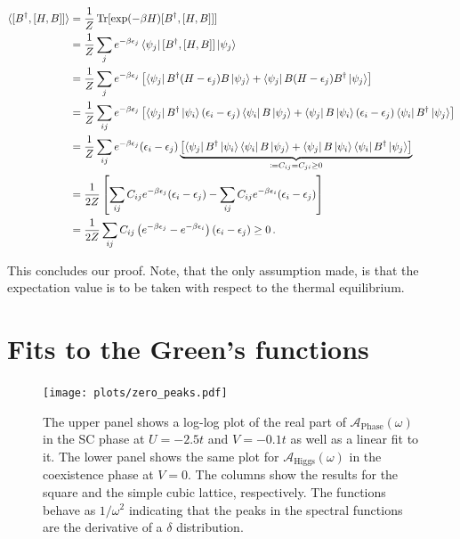 \documentclass[
    reprint, 
    aps,
    preprintnumbers,
    twocolumn,
    prb,
    superscriptaddress
]{revtex4-2}
\newcommand{\spectral}[1]{\mathcal{A}_\text{#1}  (\omega)}
\begin{document}
\begin{widetext}
    \begin{align}
        \langle [B^\dagger, [H, B]] \rangle &= \frac{1}{Z} \Trace [\exp(-\beta H) [B^\dagger, [H, B]]] \nonumber \\
            &= \frac{1}{Z} \sum_j e^{-\beta \epsilon_j} \bra{\psi_j} [B^\dagger, [H, B]] \ket{\psi_j} \nonumber \\
            &= \frac{1}{Z} \sum_j e^{-\beta \epsilon_j} \left[ \bra{\psi_j} B^\dagger (H - \epsilon_j) B \ket{\psi_j} + \bra{\psi_j} B (H - \epsilon_j) B^\dagger \ket{\psi_j} \right] \nonumber \\
            &= \frac{1}{Z} \sum_{ij} e^{-\beta \epsilon_j} \left[ \bra{\psi_j} B^\dagger \ket{\psi_i} (\epsilon_i - \epsilon_j) \bra{\psi_i} B \ket{\psi_j} + \bra{\psi_j} B \ket{\psi_i} (\epsilon_i - \epsilon_j) \bra{\psi_i} B^\dagger \ket{\psi_j} \right] \nonumber \\
            &= \frac{1}{Z} \sum_{ij} e^{-\beta \epsilon_j} (\epsilon_i - \epsilon_j) \underbrace{ \left[ \bra{\psi_j} B^\dagger \ket{\psi_i} \bra{\psi_i} B \ket{\psi_j} + \bra{\psi_j} B \ket{\psi_i} \bra{\psi_i} B^\dagger \ket{\psi_j} \right]}_{\coloneqq C_{ij} = C_{ji} \geq 0} \nonumber \\
            &= \frac{1}{2Z} \left[ \sum_{ij} C_{ij} e^{-\beta \epsilon_j} (\epsilon_i - \epsilon_j) - \sum_{ij} C_{ij} e^{-\beta \epsilon_i} (\epsilon_i - \epsilon_j) \right] \nonumber \\
            &= \frac{1}{2Z} \sum_{ij} C_{ij} \left( e^{-\beta \epsilon_j} - e^{-\beta \epsilon_i} \right) \left( \epsilon_i - \epsilon_j \right) \geq 0 \,.
    \end{align}
\end{widetext}

This concludes our proof. Note, that the only assumption made, is that the expectation value is to be taken with respect to the thermal equilibrium.


\section{Fits to the Green's functions}
\label{sec:fit_greens_functions}

\begin{figure}
    \centering
    \texttt{[image: plots/zero\_peaks.pdf]}
    \caption{The upper panel shows a log-log plot of the real part of $\spectral{Phase}$ in the SC phase at $U=-2.5t$ and $V=-0.1t$ as well as a linear fit to it.
    The lower panel shows the same plot for $\spectral{Higgs}$ in the coexistence phase at $V=0$. The columns show the results for the square and the simple cubic lattice, respectively.
    The functions behave as $1/\omega^2$ indicating that the peaks in the spectral functions are the derivative of a $\delta$ distribution.}
    \label{fig:zero_peaks}
\end{figure}
\end{document}
